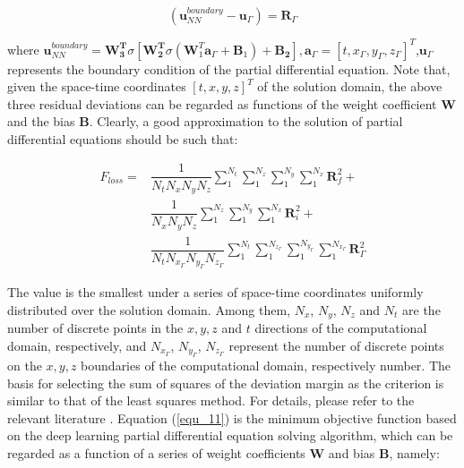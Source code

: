 \documentclass[10pt,journal,compsoc]{IEEEtran}
\begin{document}
\begin{equation}
(\mathbf{u}_{NN}^{boundary} - \mathbf{u}_{\Gamma}) = \mathbf{R}_{\Gamma}
\label{equ_10}
\end{equation}

where $\mathbf{u}_{NN}^{boundary}=\mathbf{W_{3}^{T}} \sigma{[\mathbf{W_{2}^{T}} \sigma{(\mathbf{W}_{1}^{T}  \mathbf{a}_{\Gamma} + \mathbf{B}_{1})} + \mathbf{B_2}]},\mathbf{a}_{\Gamma}=[t,x_{\Gamma},y_{\Gamma},z_{\Gamma}]^{T}$,$\mathbf{u}_{\Gamma}$ represents the boundary condition of the partial differential equation. Note that, given the space-time coordinates $[t, x, y, z]^{T}$ of the solution domain, the above three residual deviations can be regarded as functions of the weight coefficient $\mathbf{W}$ and the bias $\mathbf{B}$. Clearly, a good approximation to the solution of partial differential equations should be such that:


\begin{equation}
\begin{aligned}
F_{loss} = 
&\dfrac{1}{N_{t}N_{x}N_{y}N_{z}} \sum_{1}^{N_{t}}  \sum_{1}^{N_{z}} \sum_{1}^{N_{y}} \sum_{1}^{N_{x}} \mathbf{R}_{f}^{2} + \\
&\dfrac{1}{N_{x} N_{y} N_{z}} \sum_{1}^{N_{z}}  \sum_{1}^{N_{y}} \sum_{1}^{N_{x}} \mathbf{R}_{i}^{2} + \\
&\dfrac{1}{N_{t}N_{x_{\Gamma}}N_{y_{\Gamma}}N_{z_{\Gamma}}} \sum_{1}^{N_{t}}  \sum_{1}^{N_{z_{\Gamma}}} \sum_{1}^{N_{y_{\Gamma}}} \sum_{1}^{N_{x_{\Gamma}}} \mathbf{R}_{\Gamma}^{2} 
\end{aligned}
\label{equ_11}
\end{equation}

The value is the smallest under a series of space-time coordinates uniformly distributed over the solution domain. Among them, $N_x$, $N_y$, $N_z$ and $N_t$ are the number of discrete points in the $x,y,z$ and $t$ directions of the computational domain, respectively, and $N_{x_{\Gamma}}$, $N_{y_{\Gamma}}$, $N_{z_{\Gamma}}$ represent the number of discrete points on the $x,y,z$ boundaries of the computational domain, respectively number. The basis for selecting the sum of squares of the deviation margin as the criterion is similar to that of the least squares method. For details, please refer to the relevant literature \cite{kopriva2009}. Equation (\ref{equ_11}) is the minimum objective function based on the deep learning partial differential equation solving algorithm, which can be regarded as a function of a series of weight coefficients $\mathbf{W}$ and bias $\mathbf{B}$, namely:
\end{document}

